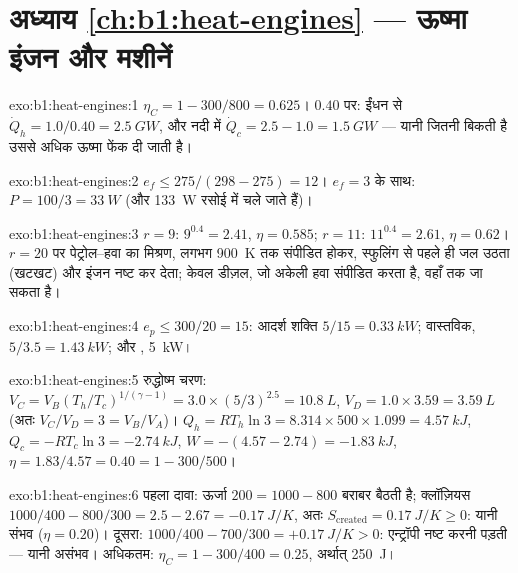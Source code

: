 \section*{अध्याय \ref{ch:b1:heat-engines} --- ऊष्मा इंजन और मशीनें}

\begin{solution}{exo:b1:heat-engines:1}
$\eta_C = 1 - 300/800 = 0.625$। $0.40$ पर: ईंधन से $\dot Q_h = 1.0/0.40 = \qty{2.5}{GW}$,
और नदी में $\dot Q_c = 2.5 - 1.0 = \qty{1.5}{GW}$ --- यानी जितनी बिकती है
उससे अधिक ऊष्मा फेंक दी जाती है।
\end{solution}

\begin{solution}{exo:b1:heat-engines:2}
$e_f \leq 275/(298 - 275) = 12$। $e_f = 3$ के साथ: $P = 100/3 = \qty{33}{W}$
(और \qty{133}{W} रसोई में चले जाते हैं)।
\end{solution}

\begin{solution}{exo:b1:heat-engines:3}
$r = 9$: $9^{0.4} = 2.41$, $\eta = 0.585$; $r = 11$: $11^{0.4} = 2.61$,
$\eta = 0.62$। $r = 20$ पर पेट्रोल--हवा का मिश्रण, लगभग
\qty{900}{K} तक संपीडित होकर, स्फुलिंग से पहले ही जल उठता (खटखट) और इंजन
नष्ट कर देता; केवल डीज़ल, जो अकेली हवा संपीडित करता है, वहाँ तक जा सकता है।
\end{solution}

\begin{solution}{exo:b1:heat-engines:4}
$e_p \leq 300/20 = 15$: आदर्श शक्ति $5/15 = \qty{0.33}{kW}$; वास्तविक, $5/3.5 =
\qty{1.43}{kW}$; और , \qty{5}{kW}।
\end{solution}

\begin{solution}{exo:b1:heat-engines:5}
रुद्धोष्म चरण: $V_C = V_B(T_h/T_c)^{1/(\gamma-1)} = 3.0 \times (5/3)^{2.5} =
\qty{10.8}{L}$, $V_D = 1.0 \times 3.59 = \qty{3.59}{L}$ (अतः $V_C/V_D = 3 =
V_B/V_A$)। $Q_h = RT_h\ln3 = 8.314 \times 500 \times 1.099 = \qty{4.57}{kJ}$,
$Q_c = -RT_c\ln3 = \qty{-2.74}{kJ}$, $W = -(4.57 - 2.74) = \qty{-1.83}{kJ}$,
$\eta = 1.83/4.57 = 0.40 = 1 - 300/500$।
\end{solution}

\begin{solution}{exo:b1:heat-engines:6}
पहला दावा: ऊर्जा $200 = 1000 - 800$ बराबर बैठती है; क्लॉज़ियस $1000/400 - 800/300
= 2.5 - 2.67 = \qty{-0.17}{J/K}$, अतः $S_{\mathrm{created}} = \qty{0.17}{J/K} \geq 0$:
यानी संभव ($\eta = 0.20$)। दूसरा: $1000/400 - 700/300 = +\qty{0.17}{J/K} > 0$:
एन्ट्रॉपी नष्ट करनी पड़ती --- यानी असंभव। अधिकतम: $\eta_C = 1 -
300/400 = 0.25$, अर्थात् \qty{250}{J}।
\end{solution}


